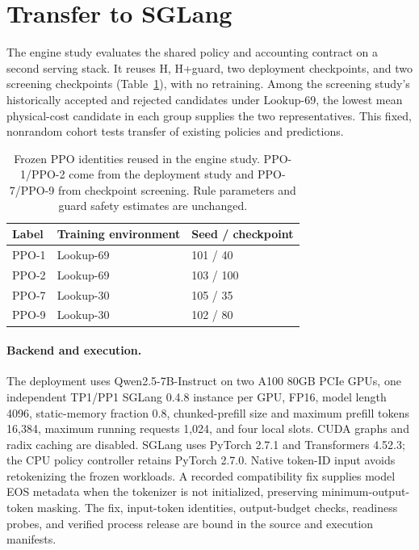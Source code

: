\section{Transfer to SGLang}
\label{app:e4}
The engine study evaluates the shared policy and accounting contract on a second serving
stack. It reuses H, H+guard, two deployment checkpoints, and two screening checkpoints
(Table~\ref{tab:e4identities}), with no retraining. Among the screening study's historically
accepted and rejected candidates under Lookup-69, the lowest mean physical-cost
candidate in each group supplies the two representatives. This fixed,
nonrandom cohort tests transfer of existing policies and predictions.

\begin{table}[t]
\centering
\small
\caption{Frozen PPO identities reused in the engine study. PPO-1/PPO-2 come from
the deployment study and PPO-7/PPO-9 from checkpoint screening. Rule parameters and guard safety estimates are unchanged.}
\label{tab:e4identities}
\setlength{\tabcolsep}{3pt}
\par\vspace{4pt}
\begin{tabular*}{\linewidth}{@{\extracolsep{\fill}}lll@{}}
\toprule
Label & Training environment & Seed / checkpoint\\
\midrule
PPO-1 & Lookup-69 & 101 / 40\\
PPO-2 & Lookup-69 & 103 / 100\\
PPO-7 & Lookup-30 & 105 / 35\\
PPO-9 & Lookup-30 & 102 / 80\\
\bottomrule
\end{tabular*}
\end{table}

\paragraph{Backend and execution.}
The deployment uses Qwen2.5-7B-Instruct on two A100 80GB PCIe GPUs,
one independent TP1/PP1 SGLang 0.4.8 instance per GPU, FP16, model length
4096, static-memory fraction 0.8, chunked-prefill size and maximum prefill
tokens 16,384, maximum running requests 1,024, and four local slots.
CUDA graphs and radix caching are disabled. SGLang uses PyTorch 2.7.1 and
Transformers 4.52.3; the CPU policy controller retains PyTorch 2.7.0.
Native token-ID input avoids retokenizing the frozen workloads. A recorded
compatibility fix supplies model EOS metadata when the tokenizer is not
initialized, preserving minimum-output-token masking. The fix, input-token
identities, output-budget checks, readiness probes, and verified process
release are bound in the source and execution manifests.

